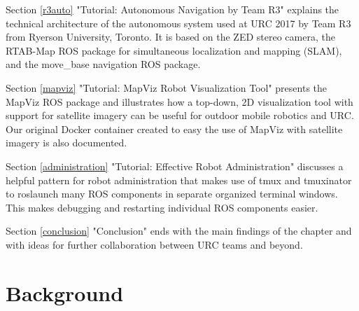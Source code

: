 \documentclass[runningheads,a4paper]{llncs}
\begin{document}
Section \ref{r3auto} "Tutorial: Autonomous Navigation by Team R3" explains the technical architecture of the autonomous system used at URC 2017 by Team R3 from Ryerson University, Toronto. It is based on the ZED stereo camera, the RTAB-Map ROS package for simultaneous localization and mapping (SLAM), and the move\_base navigation ROS package.

Section \ref{mapviz} "Tutorial: MapViz Robot Visualization Tool" presents the MapViz ROS package and illustrates how a top-down, 2D visualization tool with support for satellite imagery can be useful for outdoor mobile robotics and URC. Our original Docker container created to easy the use of MapViz with satellite imagery is also documented.

Section \ref{administration} "Tutorial: Effective Robot Administration" discusses a helpful pattern for robot administration that makes use of tmux and tmuxinator to roslaunch many ROS components in separate organized terminal windows. This makes debugging and restarting individual ROS components easier.

Section \ref{conclusion} "Conclusion" ends with the main findings of the chapter and with ideas for further collaboration between URC teams and beyond.



\section{Background}\label{background}
\end{document}
